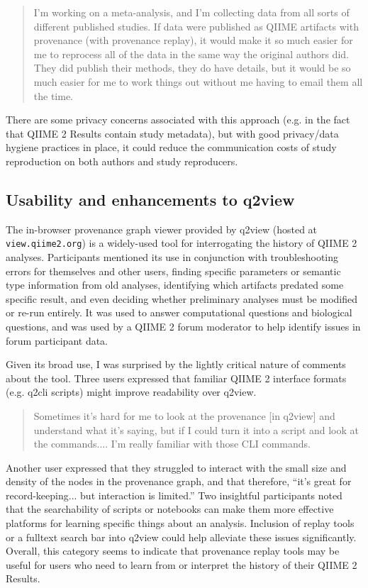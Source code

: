 \begin{quote}
I'm working on a meta-analysis, and I'm collecting data from all sorts of
different published studies. If data were published as QIIME artifacts with
provenance (with provenance replay), it would make it so much easier for me to
reprocess all of the data in the same way the original authors did. They did
publish their methods, they do have details, but it would be so much easier for
me to work things out without me having to email them all the time.
\end{quote}

\noindent There are some privacy concerns associated with this approach (e.g. in the fact
that QIIME 2 Results contain study metadata), but with good privacy/data hygiene
practices in place, it could reduce the communication costs of study
reproduction on both authors and study reproducers.

\subsection{Usability and enhancements to q2view}
\label{section:q2view_enh}

The in-browser provenance graph viewer provided by q2view (hosted at
\texttt{view.qiime2.org}) is a widely-used tool for interrogating the history of QIIME 2
analyses. Participants mentioned its use in conjunction with troubleshooting
errors for themselves and other users, finding specific parameters or semantic
type information from old analyses, identifying which artifacts predated some
specific result, and even deciding whether preliminary analyses must be modified
or re-run entirely. It was used to answer computational questions and biological
questions, and was used by a QIIME 2 forum moderator to help identify issues in
forum participant data.

Given its broad use, I was surprised by the lightly critical nature of comments
about the tool. Three users expressed that familiar QIIME 2 interface formats
(e.g. q2cli scripts) might improve readability over q2view. 

\begin{quote}
Sometimes it's hard for me to look at the provenance [in q2view] and understand
what it's saying, but if I could turn it into a script and look at the
commands.... I'm really familiar with those CLI commands.
\end{quote}

\noindent Another user expressed that they struggled to interact with the small size and
density of the nodes in the provenance graph, and that therefore, “it's great
for record-keeping... but interaction is limited.” Two insightful participants
noted that the searchability of scripts or notebooks can make them more
effective platforms for learning specific things about an analysis. Inclusion of
replay tools or a fulltext search bar into q2view could help alleviate these
issues significantly. Overall, this category seems to indicate that provenance
replay tools may be useful for users who need to learn from or interpret the
history of their QIIME 2 Results.

